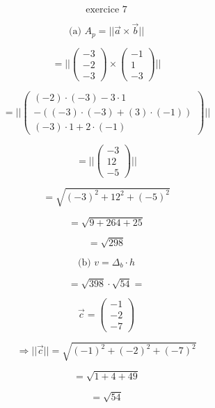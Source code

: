 \documentclass{article}
\begin{document}
\[
\text{exercice 7}
\]

\[
\text{(a) } A_p = || \vec{a} \times \vec{b} ||
\]

\[
= || \begin{pmatrix} -3 \\ -2 \\ -3 \end{pmatrix} \times \begin{pmatrix} -1 \\ 1 \\ -3 \end{pmatrix} ||
\]

\[
= || \begin{pmatrix} (-2) \cdot (-3) - 3 \cdot 1 \\ -((-3) \cdot (-3) + (3) \cdot (-1)) \\ (-3) \cdot 1 + 2 \cdot (-1) \end{pmatrix} ||
\]

\[
= || \begin{pmatrix} -3 \\ 12 \\ -5 \end{pmatrix} ||
\]

\[
= \sqrt{(-3)^2 + 12^2 + (-5)^2}
\]

\[
= \sqrt{9 + 264 + 25}
\]

\[
= \sqrt{298}
\]

\[
\text{(b) } v = \Delta_b \cdot h
\]

\[
= \sqrt{398} \cdot \sqrt{54} =
\]

\[
\vec{c} = \begin{pmatrix} -1 \\ -2 \\ -7 \end{pmatrix}
\]

\[
\Rightarrow ||\vec{c}|| = \sqrt{(-1)^2 + (-2)^2 + (-7)^2}
\]

\[
= \sqrt{1 + 4 + 49}
\]

\[
= \sqrt{54}
\]
\end{document}
